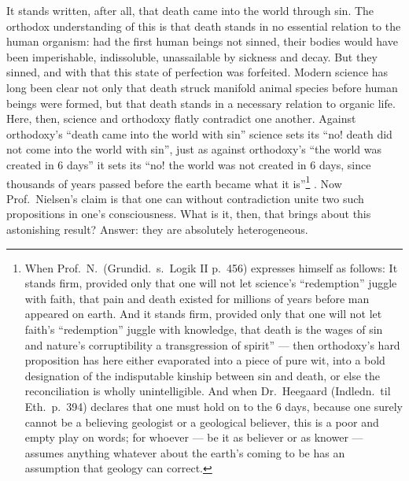 \documentclass[12pt,a4paper]{book}
\renewcommand{\thefootnote}{*)}
\newcommand{\fnmark}[2]{\renewcommand{\thefootnote}{#1}\footnote{#2}%
  \renewcommand{\thefootnote}{*)}}
\newcommand{\opage}[1]{\marginnote{\footnotesize\textit{[#1]}}}
\begin{document}
It stands written, after all, that death came into the world through sin. The
orthodox understanding of this is that death stands in no essential relation to
the human organism: had the first human beings not sinned, their bodies would
have been imperishable, indissoluble, unassailable by sickness and decay. But
they sinned, and with that this state of perfection was forfeited. Modern
science has long been clear not only that death struck manifold animal species
before human beings were formed, but that death stands in a necessary relation
to organic life. Here, then, science and orthodoxy flatly contradict one
another. Against orthodoxy's ``death came into the world with sin'' science
sets its ``no! death did not come into the world with sin'', just as against
orthodoxy's ``the world was created in 6 days'' it sets its ``no! the world was
not created in 6 days, since thousands of years passed before the earth became
what it is''\fnmark{*)}{When Prof.\ N.\ (Grundid.\ s.\ Logik II p.\ 456)
expresses himself as follows: It stands firm, provided only that one will not
let science's ``redemption'' juggle with faith, that pain and death existed for
millions of years before man appeared on earth. And it stands firm, provided
only that one will not let faith's ``redemption'' juggle with knowledge, that
death is the wages of sin and nature's corruptibility a transgression of
spirit'' --- then orthodoxy's hard proposition has here either evaporated into
a piece of pure wit, into a bold designation of the indisputable kinship
between sin and death, or else the reconciliation is wholly unintelligible. And
when Dr.\ Heegaard (Indledn.\ til Eth.\ p.\ 394) declares that one must hold on
to the 6 days, because one surely cannot be a believing geologist or a
geological believer, this is a poor and empty play on words; for whoever ---
be it as believer or as knower --- assumes anything whatever about the earth's
coming to be has an assumption that geology can correct.}. Now
\opage{31}Prof.\ Nielsen's claim is that one can without contradiction unite
two such propositions in one's consciousness. What is it, then, that brings
about this astonishing result? Answer: they are absolutely heterogeneous.
\end{document}
